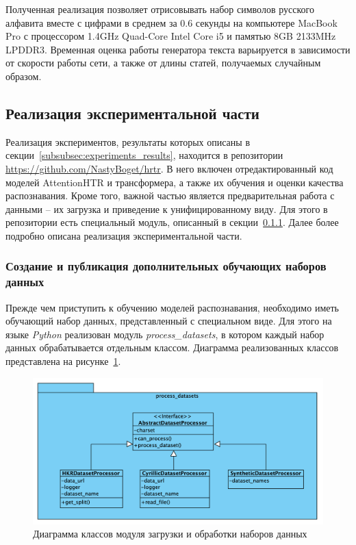 Полученная реализация позволяет отрисовывать набор символов русского алфавита вместе с цифрами в среднем за 0.6 секунды
на компьютере MacBook Pro с процессором 1.4GHz Quad-Core Intel Core i5 и памятью 8GB 2133MHz LPDDR3.
Временная оценка работы генератора текста варьируется в зависимости от скорости работы сети, а также от длины статей, получаемых случайным образом.


\subsection{Реализация экспериментальной части}
\label{subsec:hrtr}

Реализация экспериментов, результаты которых описаны в секции~\ref{subsubsec:experiments_results}, находится в репозитории \url{https://github.com/NastyBoget/hrtr}.
В него включен отредактированный код моделей AttentionHTR и трансформера, а также их обучения и оценки качества распознавания.
Кроме того, важной частью является предварительная работа с данными -- их загрузка и приведение к унифицированному виду.
Для этого в репозитории есть специальный модуль, описанный в секции~\ref{subsubsec:datasets-processing}.
Далее более подробно описана реализация экспериментальной части.

\subsubsection{Создание и публикация дополнительных обучающих наборов данных}
\label{subsubsec:datasets-processing}

Прежде чем приступить к обучению моделей распознавания, необходимо иметь обучающий набор данных, представленный с специальном виде.
Для этого на языке \textit{Python} реализован модуль \textit{process\_datasets}, в котором каждый набор данных обрабатывается отдельным классом.
Диаграмма реализованных классов представлена на рисунке~\ref{fig:diagram_process_datasets}.

\begin{figure}[h!]
    \centering
    \includegraphics[width=\textwidth]{img/diagram_process_datasets}
    \caption{Диаграмма классов модуля загрузки и обработки наборов данных}
    \label{fig:diagram_process_datasets}
\end{figure}

